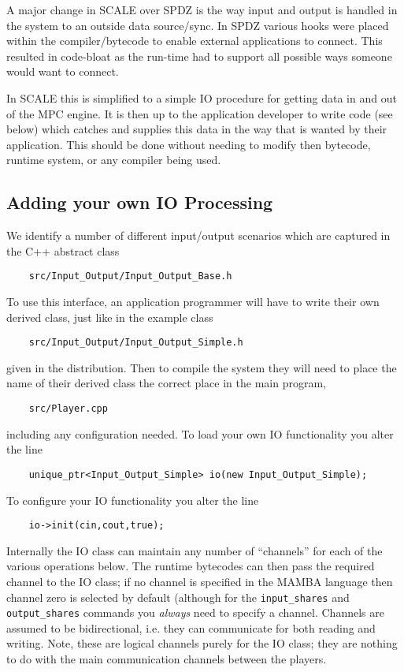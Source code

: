 \label{sec:IO}

A major change in SCALE over SPDZ is the way input and output
is handled in the system to an outside data source/sync.
In SPDZ various hooks were placed within the compiler/bytecode
to enable external applications to connect. This resulted in
code-bloat as the run-time had to support all possible
ways someone would want to connect.

In SCALE this is simplified to a simple IO procedure for
getting data in and out of the MPC engine. It is then up
to the application developer to write code (see below)
which catches and supplies this data in the way that is
wanted by their application.
This should be done without needing to modify then bytecode,
runtime system, or any compiler being used.

\subsection{Adding your own IO Processing}
We identify a number of different input/output scenarios
which are captured in the C++ abstract class 
\begin{verbatim}
    src/Input_Output/Input_Output_Base.h
\end{verbatim}
To use this interface, an application programmer will have to
write their own derived class, just like in the example
class
\begin{verbatim}
    src/Input_Output/Input_Output_Simple.h
\end{verbatim}
given in the distribution.
Then to compile the system they will need to place the
name of their derived class the correct place in the
main program, 
\begin{verbatim}
    src/Player.cpp
\end{verbatim}
including any configuration needed.
To load your own IO functionality you alter the line
\begin{verbatim}
    unique_ptr<Input_Output_Simple> io(new Input_Output_Simple);
\end{verbatim}
To configure your IO functionality you alter the line
\begin{verbatim}
    io->init(cin,cout,true);
\end{verbatim}
Internally the IO class can maintain any number of ``channels''
for each of the various operations below.
The runtime bytecodes can then pass the required channel to the 
IO class; if no channel is specified in the MAMBA language
then channel zero is selected by default (although for
the \verb+input_shares+ and \verb+output_shares+ commands
you {\em always} need to specify a channel.
Channels are assumed to be bidirectional, i.e. they can
communicate for both reading and writing.
Note, these are logical channels purely for the IO class;
they are nothing to do with the main communication channels
between the players.

